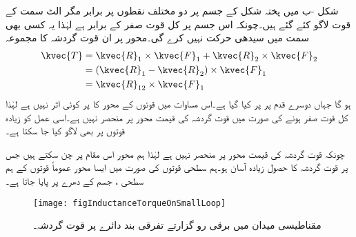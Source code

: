 شکل -ب میں  پختہ شکل کے جسم پر دو مختلف نقطوں پر برابر مگر الٹ سمت کے قوت لاگو کئے گئے ہیں۔چونکہ اس جسم پر کل قوت صفر کے برابر ہے لہٰذا یہ کسی بھی سمت میں سیدھی حرکت نہیں کرے گی۔محور  پر ان قوت گردشہ کا مجموعہ
\begin{align*}
\kvec{T}&=\kvec{R}_1 \times \kvec{F}_1+\kvec{R}_2 \times \kvec{F}_2\\
&=(\kvec{R}_1-\kvec{R}_2) \times \kvec{F}_1\\
&=\kvec{R}_{12} \times \kvec{F}_1
\end{align*}
ہو گا جہاں دوسرے قدم پر   پر کیا گیا ہے۔اس مساوات میں قوتوں کے محور کا  پر کوئی اثر نہیں ہے لہٰذا کل قوت صفر ہونے کی صورت میں قوت گردشہ کی قیمت محور پر منحصر نہیں ہے۔اسی عمل کو زیادہ قوتوں پر بھی لاگو کیا جا سکتا ہے۔

چونکہ قوت گردشہ کی قیمت محور پر منحصر نہیں ہے لہٰذا ہم محور اس مقام پر چن سکتے ہیں جس پر قوت گردشہ کا حصول زیادہ آسان ہو۔ہم سطحی قوتوں کی صورت میں ایسا محور عموماً قوتوں کے ہم سطحی ، جسم  کے دھرے پر پایا جاتا ہے۔

\begin{figure}
\centering
\texttt{[image: figInductanceTorqueOnSmallLoop]}
\caption{مقناطیسی میدان میں برقی رو گزارتے تفرقی بند دائرے پر قوت گردشہ۔}
\label{شکل_امالہ-تفرقی_دائرے_پر_مروڑ}
\end{figure}

